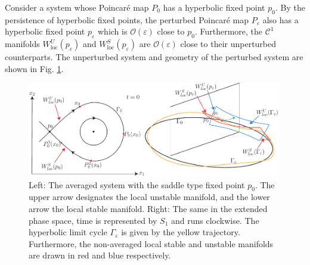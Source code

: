 \begin{ex}
	Consider a system whose Poincaré map $P_0$ has a hyperbolic fixed point $p_0$. By the persistence of hyperbolic fixed points, the perturbed Poincaré map $P_\varepsilon$ also has a hyperbolic fixed point $p_\varepsilon$ which is $\mathcal{O}(\varepsilon)$ close to $p_0$. Furthermore, the $\mathcal{C}^{1}$ manifolds $W^{U}_{ \textrm{loc} }(p_\varepsilon)$ and $W^{S}_{ \textrm{loc} }(p_{\varepsilon})$ are $\mathcal{O}(\varepsilon)$ close to their unperturbed counterparts. The unperturbed system and geometry of the perturbed system are shown in Fig. \ref{fig:avg_ex_2}.
	\begin{figure}[h!]
		\centering
		\includegraphics[width=0.99\textwidth]{figures/ch5/4avg_ex_2.pdf}
		\caption{Left: The averaged system with the saddle type fixed point $p_0$. The upper arrow designates the local unstable manifold, and the lower arrow the local stable manifold. Right: The same in the extended phase space, time is represented by $S_1$ and runs clockwise. The hyperbolic limit cycle $\Gamma_\varepsilon$ is given by the yellow trajectory. Furthermore, the non-averaged local stable and unstable manifolds are drawn in red and blue respectively.}
		\label{fig:avg_ex_2}
	\end{figure}
	
\end{ex}

